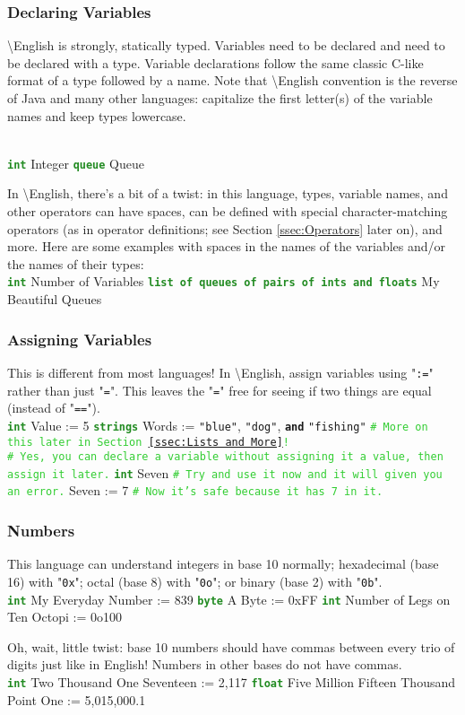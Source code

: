 \documentclass{article}
\newcommand{\English}{\textbackslash{}English}				%
\newcommand{\sssecl}[1]{\subsubsection{#1}\label{sssec:#1}}
\newcommand{\codecomment}[1]{\texttt{\textcolor{LimeGreen}{#1}}}
\newcommand{\commentline}[1]{\codecomment{\# #1}}
\newcommand{\type}[1]{\texttt{\textcolor{ForestGreen}{\textbf{#1}}}}
\newcommand{\common}[1]{\texttt{\textcolor{Mulberry}{\textbf{#1}}}}
\newcommand{\codestring}[1]{\texttt{\textcolor{NavyBlue}{"#1"}}}
\newenvironment{code}[0]
{\ttfamily{}				%
\setlength\parindent{0cm}	%
~\\}
{\setlength\parindent{1cm}
~\\}
\begin{document}
\sssecl{Declaring Variables}
\indent \English{} is strongly, statically typed. Variables need to be declared and need to be declared with a type. Variable declarations follow the same classic C-like format of a type followed by a name. Note that \English{} convention is the reverse of Java and many other languages: capitalize the first letter(s) of the variable names and keep types lowercase.

\begin{code}
\type{int} Integer
\type{queue} Queue
\end{code}

In \English{}, there's a bit of a twist: in this language, types, variable names, and other operators can have spaces, can be defined with special character-matching operators (as in operator definitions; see Section \ref{ssec:Operators} later on), and more. Here are some examples with spaces in the names of the variables and/or the names of their types:
\begin{code}
\type{int} Number of Variables
\type{list of queues of pairs of ints and floats} My Beautiful Queues
\end{code}

\sssecl{Assigning Variables}
\indent This is different from most languages! In \English{}, assign variables using "\texttt{:=}" rather than just "\texttt{=}". This leaves the "\texttt{=}" free for seeing if two things are equal (instead of "\texttt{==}").
\begin{code}
\type{int} Value := 5
\type{strings} Words := \codestring{blue}, \codestring{dog}, \common{and} \codestring{fishing} \commentline{More on this later in Section \ref{ssec:Lists and More}!}\\
\commentline{Yes, you can declare a variable without assigning it a value, then assign it later.}
\type{int} Seven	\commentline{Try and use it now and it will given you an error.}
Seven := 7	\commentline{Now it's safe because it has 7 in it.}
\end{code}

\sssecl{Numbers}
\indent This language can understand integers in base 10 normally; hexadecimal (base 16) with "\texttt{0x}"; octal (base 8) with "\texttt{0o}"; or binary (base 2) with "\texttt{0b}".
\begin{code}
\type{int} My Everyday Number := 839
\type{byte} A Byte := 0xFF
\type{int} Number of Legs on Ten Octopi := 0o100
\end{code}

\indent Oh, wait, little twist: base 10 numbers should have commas between every trio of digits just like in English! Numbers in other bases do not have commas.
\begin{code}
\type{int} Two Thousand One Seventeen := 2,117
\type{float} Five Million Fifteen Thousand Point One := 5,015,000.1
\end{code}
\end{document}
